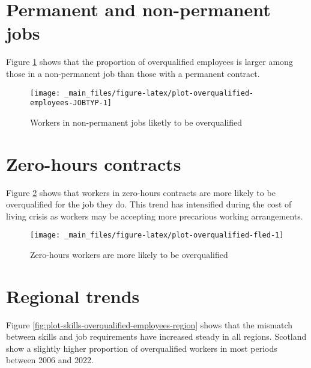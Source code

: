 \documentclass[
]{book}
\begin{document}
\hypertarget{permanent-and-non-permanent-jobs}{%
\section{Permanent and non-permanent jobs}\label{permanent-and-non-permanent-jobs}}

Figure \ref{fig:plot-overqualified-employees-JOBTYP} shows that the proportion of overqualified employees is larger among those in a non-permanent job than those with a permanent contract.

\begin{figure}

{\centering \texttt{[image: \_main\_files/figure-latex/plot-overqualified-employees-JOBTYP-1]} 

}

\caption{Workers in non-permanent jobs liketly to be overqualified }\label{fig:plot-overqualified-employees-JOBTYP}
\end{figure}

\hypertarget{zero-hours-contracts-1}{%
\section{Zero-hours contracts}\label{zero-hours-contracts-1}}

Figure \ref{fig:plot-overqualified-fled} shows that workers in zero-hours contracts are more likely to be overqualified for the job they do. This trend has intensified during the cost of living crisis as workers may be accepting more precarious working arrangements.

\begin{figure}

{\centering \texttt{[image: \_main\_files/figure-latex/plot-overqualified-fled-1]} 

}

\caption{Zero-hours workers are more likely to be overqualified}\label{fig:plot-overqualified-fled}
\end{figure}

\hypertarget{regional-trends-2}{%
\section{Regional trends}\label{regional-trends-2}}

Figure \ref{fig:plot-skills-overqualified-employees-region} shows that the mismatch between skills and job requirements have increased steady in all regions. Scotland show a slightly higher proportion of overqualified workers in most periods between 2006 and 2022.
\end{document}
